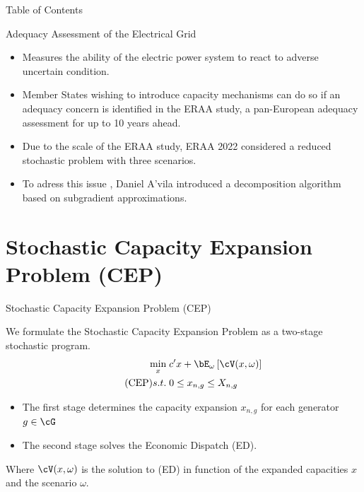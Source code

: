 \documentclass[11pt, aspectratio=169]{beamer}
\begin{document}
\begin{frame}{Table of Contents}
\tableofcontents
\end{frame}



\begin{frame}{Adequacy Assessment of the Electrical Grid}
  \begin{itemize}
    \item Measures the ability of the electric power system to react to adverse uncertain condition. \pause
    \item Member States wishing to introduce capacity mechanisms can do so if an adequacy concern is identified in the ERAA study, a pan-European adequacy assessment for up to 10 years ahead. \pause
    \item Due to the scale of the ERAA study, ERAA 2022 considered a reduced stochastic problem with three scenarios. \pause
    \item To adress this issue \cite{DecompAlg}, Daniel A'vila introduced a decomposition algorithm based on subgradient approximations. \pause
  \end{itemize}
\end{frame}

\section{Stochastic Capacity Expansion Problem (CEP)}

\begin{frame}{Stochastic Capacity Expansion Problem (CEP)}

  We formulate the Stochastic Capacity Expansion Problem as a two-stage stochastic program. \pause
  \begin{align*}
    \min_{x} \; & c'x + \bE_{\omega}\left[\cV(x,\omega)\right] \\  \tag{CEP}
    s.t. \;     & 0 \leq x_{n,g} \leq X_{n,g}
  \end{align*}
  \begin{itemize}
    \pause
    \item The first stage determines the capacity expansion \(x_{n,g}\) for each generator \(g \in \cG \) \pause
    \item The second stage solves the Economic Dispatch (ED). \pause
  \end{itemize}

  Where \(\cV(x,\omega)\) is the solution to (ED) in function of the expanded capacities \(x\) and the scenario \(\omega\).
\end{frame}
\end{document}
